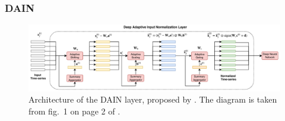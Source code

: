 \documentclass{statsmsc}
\begin{document}
{%
\subsubsection{DAIN}%
\label{ssub:DAIN}



\begin{figure}
    \begin{center}
        \includegraphics[width=\textwidth]{diagrams/dain_diagram.pdf}
    \end{center}
    \caption{Architecture of the \acf{DAIN} layer, proposed by \citeauthor{dain}. The diagram
    is taken from fig.\ 1 on page 2 of \cite{dain}.}
    \label{fig:dain-arch}
\end{figure}

}
\end{document}
